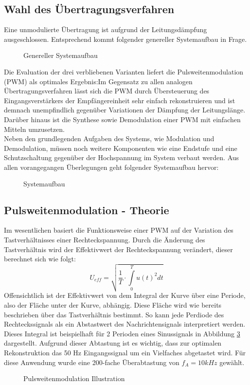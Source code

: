 \subsection{Wahl des Übertragungsverfahren}
Eine unmodulierte Übertragung ist aufgrund der Leitungsdämpfung ausgeschlossen. Entsprechend kommt folgender genereller Systemaufbau in Frage.
\begin{figure}[H]
\centering
  
  \caption{Genereller Systemaufbau}
  \label{fig:psystem}
\end{figure}
Die Evaluation der drei verbliebenen Varianten liefert die Pulsweitenmodulation (PWM) als optimales Ergebnis:Im Gegensatz zu allen analogen Übertragungsverfahren lässt sich die PWM durch Übersteuerung des Eingangsverstärkers der Empfängereinheit sehr einfach rekonstruieren und ist demnach unempfindlich gegenüber Variationen der Dämpfung der Leitungslänge. Darüber hinaus ist die Synthese sowie Demodulation einer PWM mit einfachen Mitteln umzusetzen.\\
Neben den grundlegenden Aufgaben des Systems, wie Modulation und Demodulation, müssen noch weitere Komponenten wie eine Endstufe und eine Schutzschaltung gegenüber der Hochspannung im System verbaut werden. 
Aus allen vorangegangen Überlegungen geht folgender Systemaufbau hervor: 
\begin{figure}[H]
  \centering
  \scalebox{0.97}{
  }
  \caption{Systemaufbau}
  \label{fig:system}
\end{figure}

\subsection{Pulsweitenmodulation - Theorie}
\label{sec:pwmTheory}
Im wesentlichen basiert die Funktionsweise einer PWM auf der Variation des Tastverhältnisses einer Rechteckspannung. Durch die Änderung des Tastverhältnis wird der Effektivwert der Rechteckspannung verändert, dieser berechnet sich wie folgt:
\begin{equation}
 U_{eff} = \sqrt{\frac{1}{T}\cdot\int\limits_{0}^T u(t)^2 dt}
\end{equation}
Offensichtlich ist der Effektivwert von dem Integral der Kurve über eine Periode, also der Fläche unter der Kurve, abhängig. Diese Fläche wird wie bereits beschrieben über das Tastverhältnis bestimmt. So kann jede Perdiode des Rechteckssignals als ein Abstastwert des Nachrichtensignals interpretiert werden. Dieses Integral ist beispielhaft für 2 Perioden eines Sinussignals in Abbildung \ref{fig:pwmArea} dargestellt. Aufgrund dieser Abtastung ist es wichtig, dass zur optimalen Rekonstruktion das 50 Hz Eingangssignal um ein Vielfaches abgetastet wird. Für diese Anwendung wurde eine 200-fache Überabtastung von $f_A=10kHz$ gewählt.
\begin{figure}[H]
  \centering
   
   \caption{Pulsweitenmodulation Illustration}
  \label{fig:pwmArea}
\end{figure}

\newpage
